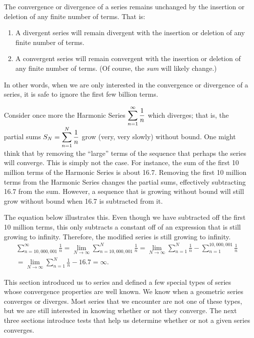 \begin{theorem}\label{thm:series_behavior}%
The convergence or divergence of a series remains unchanged by the insertion or deletion of any finite number of terms. That is:
\begin{enumerate}
	\item	A divergent series will remain divergent with the insertion or deletion of any finite number of terms.
	\item	A convergent series will remain convergent with the insertion or deletion of any finite number of terms. (Of course, the \emph{sum} will likely change.)
\end{enumerate}
\end{theorem}

In other words, when we are only interested in the convergence or divergence of a series, it is safe to ignore the first few billion terms.

\begin{example}\label{ex_trunc_harm}%
Consider once more the Harmonic Series $\displaystyle\sum_{n=1}^\infty\frac1n$\vspace{-.8\baselineskip} which diverges; that is, the partial sums $S_N=\displaystyle\sum_{n=1}^N\frac1n$ grow (very, very slowly) without bound. One might think that by removing the ``large'' terms of the sequence that perhaps the series will converge. This is simply not the case. For instance, the sum of the first 10 million terms of the Harmonic Series is about 16.7. Removing the first 10 million terms from the Harmonic Series changes the partial sums,  effectively subtracting 16.7 from the sum. However, a sequence that is growing without bound will still grow without bound when 16.7 is subtracted from it. 

The equation below illustrates this. Even though we have subtracted off the first 10 million terms, this only subtracts a constant off of an expression that is still growing to infinity. Therefore, the modified series is still growing to infinity.
\begin{multline*}
 \sum_{n=10,000,001}^\infty\frac1n
 =\lim_{N\to\infty}\sum_{n=10,000,001}^N\frac1n
 =\lim_{N\to\infty}\sum_{n=1}^N\frac1n-\sum_{n=1}^{10,000,001}\frac1n \\
 =\lim_{N\to\infty}\sum_{n=1}^N\frac1n-16.7
 =\infty.
\end{multline*}
\end{example}

This section introduced us to series and defined a few special types of series whose convergence properties are well known. We know when a geometric series converges or diverges. Most series that we encounter are not one of these types, but we are still interested in knowing whether or not they converge. The next three sections introduce tests that help us determine whether or not a given series converges.

